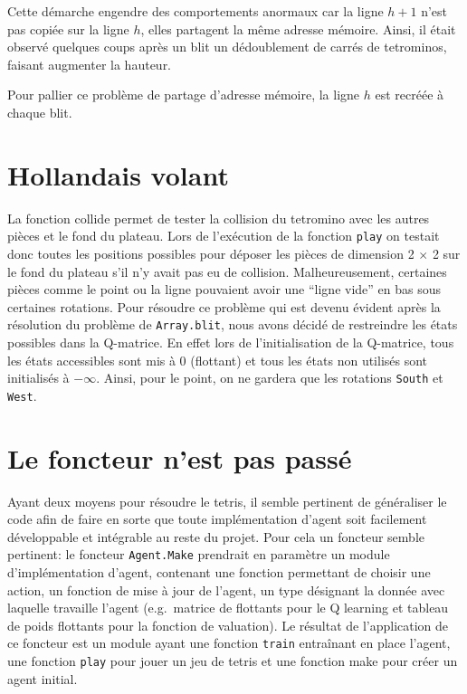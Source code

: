 \documentclass{report}
\begin{document}
Cette démarche engendre des comportements anormaux car la ligne \(h+1\) n'est
pas copiée sur la ligne \(h\), elles partagent la même adresse mémoire. Ainsi,
il était observé quelques coups après un blit un dédoublement de carrés de
tetrominos, faisant augmenter la hauteur.

Pour pallier ce problème de partage d'adresse mémoire, la ligne \(h\) est
recréée à chaque blit.

\section{Hollandais volant}\label{sec:hollandais_volant}
La fonction collide permet de tester la collision du tetromino avec les autres
pièces et le fond du plateau. Lors de l'exécution de la fonction \texttt{play}
on testait donc toutes les positions possibles pour déposer les pièces de
dimension 2 \(\times \) 2 sur le fond du plateau s'il n'y avait pas eu de
collision. Malheureusement, certaines pièces comme le point ou la ligne
pouvaient avoir une ``ligne vide'' en bas sous certaines rotations. Pour
résoudre ce problème qui est devenu évident après la résolution du problème de
\texttt{Array.blit}, nous avons décidé de restreindre les états possibles dans
la Q-matrice. En effet lors de l'initialisation de la Q-matrice, tous les états
accessibles sont mis à 0 (flottant) et tous les états non utilisés sont
initialisés à \(-\infty \). Ainsi, pour le point, on ne gardera que les
rotations \texttt{South} et \texttt{West}.

\section{Le foncteur n'est pas passé}
Ayant deux moyens pour résoudre le tetris, il semble pertinent de
généraliser le code afin de faire en sorte que toute implémentation
d'agent soit facilement développable et intégrable au reste du projet. Pour
cela un foncteur semble pertinent: le foncteur \texttt{Agent.Make} prendrait en
paramètre un module d'implémentation d'agent, contenant une fonction
permettant de choisir une action, un fonction de mise \`a jour de l'agent, un
type d\'esignant la donnée avec laquelle travaille l'agent (e.g.\ matrice de
flottants pour le Q learning et tableau de poids flottants pour la fonction de
valuation). Le r\'esultat de l'application de ce foncteur est un module ayant
une fonction \texttt{train} entra\^inant en place l'agent, une fonction
\texttt{play} pour jouer un jeu de tetris et une fonction make pour cr\'eer un
agent initial.
\end{document}
